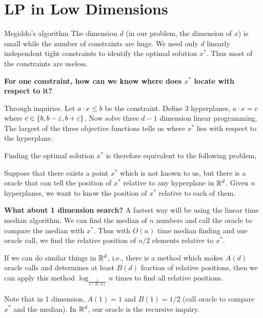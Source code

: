 \documentclass{beamer}
\begin{document}
\section{LP in Low Dimensions}
\begin{frame}[allowframebreaks]{Megiddo's algorithm}%
    The dimension $d$ (in our problem, the dimension of $x$) is small while the number of constraints are huge. We need only $d$ linearly independent tight constraints to identify the optimal solution $x^*$.
    Thus most of the constraints are useless.
    \BlankLine


    \textbf{For one constraint, how can we know where does $x^*$ locate with respect to it?}

    Through inquiries. Let $a\cdot x \leq b$ be the constraint. Define 3 hyperplanes, $a\cdot x = c$ where $c\in \left\{ b,b-\varepsilon,b+\varepsilon \right\}$. Now solve three $d-1$ dimension linear programming. The largest of the three objective functions tells us where $x^*$ lies with respect to the
    hyperplane.

    \newpage
    Finding the optimal solution $x^*$ is therefore equivalent to the following problem,
    \begin{problem}
        Suppose that there exists a point $x^*$ which is not known to us, but there is a oracle that can tell the position of $x^*$ relative to any hyperplane in $\R^d$. Given $n$ hyperplanes, we want to know the position of $x^*$ relative to each of them.
    \end{problem}

    \textbf{What about 1 dimension search?} A fastest way will be using the linear time median algorithm. We can find the median of $n$ numbers and call the oracle to compare the median with $x^*$. Thus with $O(n)$ time median finding and one oracle call, we find the relative position of $n/2$ elements relative to $x^*$.

    \newpage

    If we can do similar things in $\R^d$, i.e., there is a method which makes $A(d)$ oracle calls and determines at least $B(d)$ fraction of relative positions, then we can apply this method $\log_{\frac{1}{1-B(d)}} n$ times to find all relative positions.

    Note that in 1 dimension, $A(1)=1$ and $B(1)=1/2$ (call oracle to compare $x^*$ and the median). In $\R^d$, our oracle is the recursive inquiry.


\end{frame}
\end{document}
